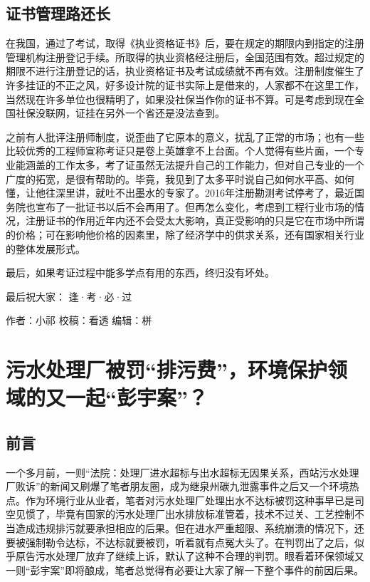 \documentclass[]{book}
\begin{document}
\hypertarget{ux8bc1ux4e66ux7ba1ux7406ux8defux8fd8ux957f}{%
\subsection{证书管理路还长}\label{ux8bc1ux4e66ux7ba1ux7406ux8defux8fd8ux957f}}

在我国，通过了考试，取得《执业资格证书》后，要在规定的期限内到指定的注册管理机构注册登记手续。所取得的执业资格经注册后，全国范围有效。超过规定的期限不进行注册登记的话，执业资格证书及考试成绩就不再有效。注册制度催生了许多挂证的不正之风，好多设计院的证书实际上是借来的，人家都不在这里工作，当然现在许多单位也很精明了，如果没社保当作你的证书不算。可是考虑到现在全国社保没联网，证挂在另外一个省还是没法查到。

之前有人批评注册师制度，说歪曲了它原本的意义，扰乱了正常的市场；也有一些比较优秀的工程师宣称考证只是卷上英雄拿不上台面。个人觉得有些片面，一个专业能涵盖的工作太多，考了证虽然无法提升自己的工作能力，但对自己专业的一个广度的拓宽，是很有帮助的。毕竟，我见到了太多平时说自己如何水平高、如何懂，让他往深里讲，就吐不出墨水的专家了。2016年注册勘测考试停考了，最近国务院也宣布了一批证书以后不会再用了。但再怎么变化，考虑到工程行业市场的情况，注册证书的作用近年内还不会受太大影响，真正受影响的只是它在市场中所谓的价格；可在影响他价格的因素里，除了经济学中的供求关系，还有国家相关行业的整体发展形式。

最后，如果考证过程中能多学点有用的东西，终归没有坏处。

最后祝大家： 逢·考·必·过

作者：小祁
校稿：看透
编辑：栟

\hypertarget{ux6c61ux6c34ux5904ux7406ux5382ux88abux7f5aux6392ux6c61ux8d39ux73afux5883ux4fddux62a4ux9886ux57dfux7684ux53c8ux4e00ux8d77ux5f6dux5b87ux6848}{%
\section{污水处理厂被罚``排污费''，环境保护领域的又一起``彭宇案''？}\label{ux6c61ux6c34ux5904ux7406ux5382ux88abux7f5aux6392ux6c61ux8d39ux73afux5883ux4fddux62a4ux9886ux57dfux7684ux53c8ux4e00ux8d77ux5f6dux5b87ux6848}}

\hypertarget{ux524dux8a00-7}{%
\subsection{前言}\label{ux524dux8a00-7}}

一个多月前，一则``法院：处理厂进水超标与出水超标无因果关系，西站污水处理厂败诉''的新闻又刷爆了笔者朋友圈，成为继泉州碳九泄露事件之后又一个环境热点。作为环境行业从业者，笔者对污水处理厂处理出水不达标被罚这种事早已是司空见惯了，毕竟有国家的污水处理厂出水排放标准管着，技术不过关、工艺控制不当造成违规排污就要承担相应的后果。但在进水严重超限、系统崩溃的情况下，还要被强制勒令达标，不达标就要被罚，听着就有点冤大头了。在判罚出了之后，似乎原告污水处理厂放弃了继续上诉，默认了这种不合理的判罚。眼看着环保领域又一则``彭宇案''即将酿成，笔者总觉得有必要让大家了解一下整个事件的前因后果。
\end{document}
